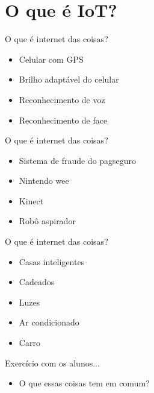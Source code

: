 \section{O que é IoT?}


\begin{frame}	
	\begin{block}{O que é internet das coisas?}
		 \begin{itemize}
			  \item Celular com GPS
			  \item Brilho adaptável do celular
			  \item Reconhecimento de voz
			  \item Reconhecimento de face
		  \end{itemize}
	\end{block}
\end{frame}


\begin{frame}	
	\begin{block}{O que é internet das coisas?}
		 \begin{itemize}
			  \item Sistema de fraude do pagseguro
			  \item Nintendo wee
			  \item Kinect
			  \item Robô aspirador
		  \end{itemize}
	\end{block}
\end{frame}


\begin{frame}	
	\begin{block}{O que é internet das coisas?}
		 \begin{itemize}
			  \item Casas inteligentes
			  \item Cadeados
			  \item Luzes
			  \item Ar condicionado
			  \item Carro			  
		  \end{itemize}
	\end{block}
\end{frame}


\begin{frame}	
	\begin{block}{Exercício com os alunos...}
		 \begin{itemize}
			  \item O que essas coisas tem em comum?
		  \end{itemize}
	\end{block}
\end{frame}


